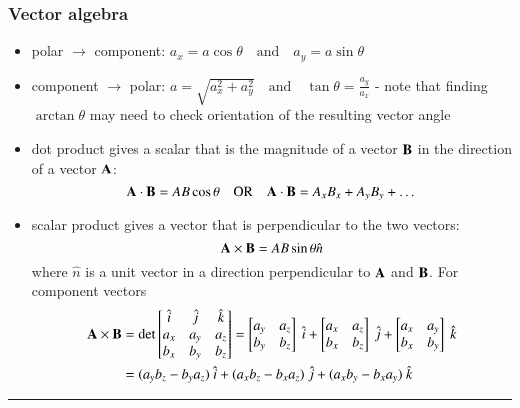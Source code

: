 \documentclass{article}
\begin{document}
\subsubsection*{Vector algebra}
\begin{itemize}
	\item polar $\to$ component: $a_x = a\cos\theta \quad \text{and} \quad a_y = a\sin\theta$
	\item component $\to$ polar: $a = \sqrt{a_x^2 + a_y^2} \quad \text{and} \quad \tan\theta = \frac{a_y}{a_x}$
	\subitem - note that finding $\arctan\theta$ may need to check orientation of the resulting vector angle
	\item dot product gives a scalar that is the magnitude of a vector $\vb{B}$ in the direction of a vector $\vb{A}$:
	\[
		\vb{A} \cdot \vb{B} = AB \cos\theta \quad \text{OR} \quad \vb{A} \cdot \vb{B} = A_xB_x + A_yB_y + \dots
	\]
	\item scalar product gives a vector that is perpendicular to the two vectors:
	\[
		\vb{A} \times \vb{B} = AB \sin \theta \hat n
	\]
	where $\hat n$ is a unit vector in a direction perpendicular to $\vb{A}$ and $\vb{B}$. For component vectors
	\begin{align*}
		\vb{A} \times \vb{B} &= \det \begin{bmatrix}
			\hat i & \hat j & \hat k \\
			a_x & a_y & a_z \\
			b_x & b_y & b_z
			\end{bmatrix} = \begin{bmatrix} a_y & a_z \\ b_y & b_z\end{bmatrix}\ \hat i + \begin{bmatrix} a_x & a_z \\ b_x & b_z\end{bmatrix}\ \hat j + \begin{bmatrix} a_x & a_y \\ b_x & b_y\end{bmatrix}\ \hat k \\
		&= (a_yb_z - b_ya_z)\ \hat i + (a_xb_z - b_xa_z)\ \hat j + (a_xb_y - b_xa_y)\ \hat k
	\end{align*}
\end{itemize}
\hrule
\end{document}
